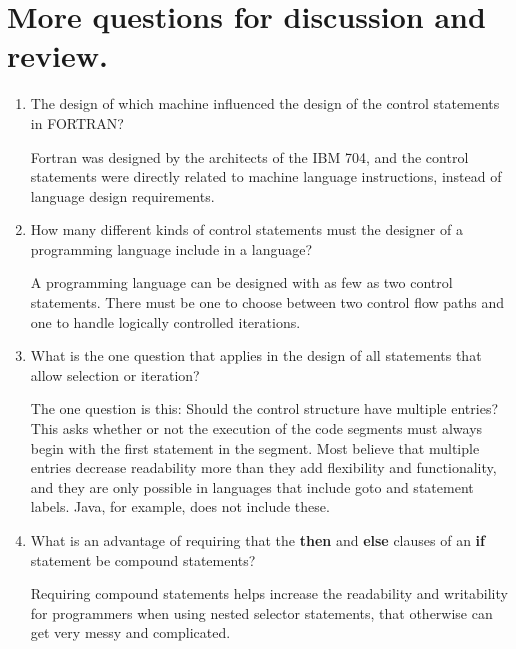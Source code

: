 \section{More questions for discussion and review.}

\begin{enumerate}
  \item The design of which machine influenced the design
    of the control statements in FORTRAN?

  \begin{answer}
    Fortran was designed by the architects of the IBM 704, and the control statements were directly related to machine language instructions, instead of language design requirements.
  \end{answer}

  \item How many different kinds of control statements
    must the designer of a programming language include
    in a language?

  \begin{answer}
    A programming language can be designed with as few as two control statements. There must be one to choose between two control flow paths and one to handle logically controlled iterations.
  \end{answer}

  \item What is the one question that applies in the
    design of all statements that allow selection or
    iteration?

  \begin{answer}
    The one question is this: Should the control structure have multiple entries? This asks whether or not the execution of the code segments must always begin with the first statement in the segment. Most believe that multiple entries decrease readability more than they add flexibility and functionality, and they are only possible in languages that include goto and statement labels. Java, for example, does not include these. 
  \end{answer}

  \item What is an advantage of requiring that
    the \textbf{then} and \textbf{else} clauses of
    an \textbf{if} statement be compound statements?

  \begin{answer}
    Requiring compound statements helps increase the readability and writability for programmers when using nested selector statements, that otherwise can get very messy and complicated.
  \end{answer}


\end{enumerate}
